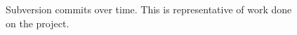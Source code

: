 \begin{figure}[p]
	\centering
	\qquad
	\caption{Subversion commits over time.
		This is representative of work done on the project.}
	\label{SVNGraphs}
\end{figure}
